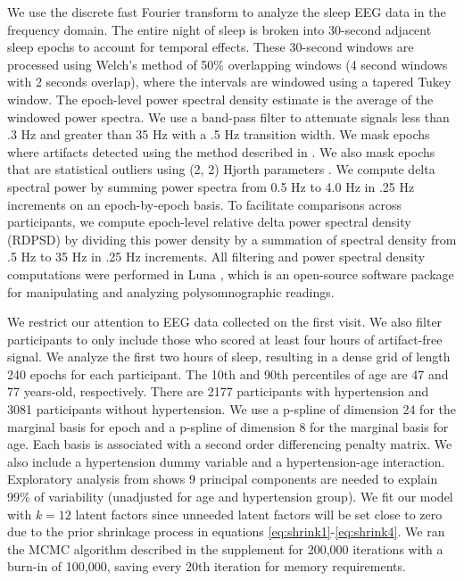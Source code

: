 \documentclass[useAMS,referee,usenatbib]{biom}
\begin{document}
We use the discrete fast Fourier transform to analyze the sleep EEG data in the frequency domain. The entire night of sleep is broken into 30-second adjacent sleep epochs to account for temporal effects. These 30-second windows are processed using Welch's method of 50\% overlapping windows (4 second windows with 2 seconds overlap), where the intervals are windowed using a tapered Tukey window. The epoch-level power spectral density estimate is the average of the windowed power spectra. We use a band-pass filter to attenuate signals less than .3 Hz and greater than 35 Hz with a .5 Hz transition width. We mask epochs where artifacts detected using the method described in \citet{Buckelmuller2006}. We also mask epochs that are statistical outliers using (2, 2) Hjorth parameters \citet{Hjorth1970}. We compute delta spectral power by summing power spectra from 0.5 Hz to 4.0 Hz in .25 Hz increments on an epoch-by-epoch basis. To facilitate comparisons across participants, we compute epoch-level relative delta power spectral density (RDPSD) by dividing this power density by a summation of spectral density from .5 Hz to 35 Hz in .25 Hz increments. All filtering and power spectral density computations were performed in Luna \citep{Shaun2020}, which is an open-source software package for manipulating and analyzing polysomnographic readings.

We restrict our attention to EEG data collected on the first visit. We also filter participants to only include those who scored at least four hours of artifact-free signal. We analyze the first two hours of sleep, resulting in a dense grid of length 240 epochs for each participant. The 10th and 90th percentiles of age are 47 and 77 years-old, respectively. There are 2177 participants with hypertension and 3081 participants without hypertension. We use a p-spline of dimension 24 for the marginal basis for epoch and a p-spline of dimension 8 for the marginal basis for age. Each basis is associated with a second order differencing penalty matrix. We also include a hypertension dummy variable and a hypertension-age interaction. Exploratory analysis from \citet{Castro1986, fdapace} shows 9 principal components are needed to explain 99\% of variability (unadjusted for age and hypertension group). We fit our model with $k = 12$ latent factors since unneeded latent factors will be set close to zero due to the prior shrinkage process in equations \ref{eq:shrink1}-\ref{eq:shrink4}. We ran the MCMC algorithm described in the supplement for 200,000 iterations with a burn-in of 100,000, saving every 20th iteration for memory requirements.   
\end{document}
